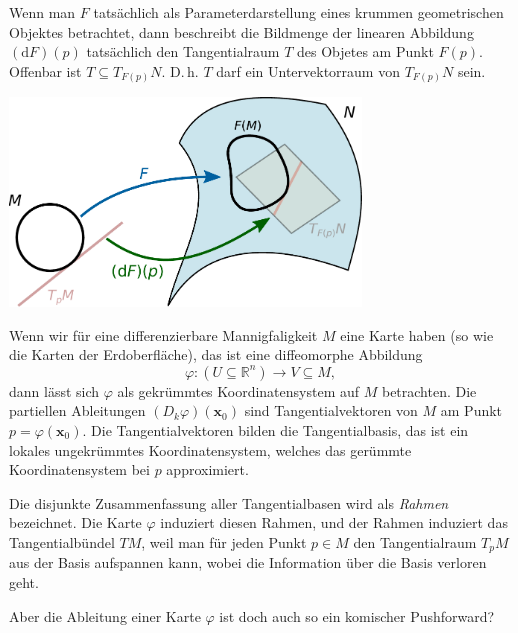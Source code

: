 \documentclass[9pt]{beamer}
\newcommand{\R}{\mathbb R}
\begin{document}
\begin{frame}
Wenn man $F$ tatsächlich als Parameterdarstellung eines krummen
geometrischen Objektes betrachtet, dann beschreibt die Bildmenge
der linearen Abbildung $(\mathrm dF)(p)$ tatsächlich den
Tangentialraum $T$ des Objetes am Punkt $F(p)$. Offenbar ist
$T\subseteq T_{F(p)}N$. D.\,h. $T$ darf ein Untervektorraum
von $T_{F(p)}N$ sein.
\end{frame}

\begin{frame}
\begin{center}
\includegraphics[width=0.7\textwidth]{img/Differential.pdf}
\end{center}
\end{frame}

\begin{frame}
Wenn wir für eine differenzierbare Mannigfaligkeit $M$ eine Karte
haben (so wie die Karten der Erdoberfläche), das ist eine diffeomorphe
Abbildung
\[\varphi\colon (U\subseteq \R^n)\to V\subseteq M,\]
dann lässt sich $\varphi$ als gekrümmtes Koordinatensystem auf $M$
betrachten. Die partiellen Ableitungen $(D_k\varphi)(\mathbf x_0)$ sind
Tangentialvektoren von $M$ am Punkt $p=\varphi(\mathbf x_0)$.
Die Tangentialvektoren bilden die Tangentialbasis, das ist ein lokales
ungekrümmtes Koordinatensystem, welches das gerümmte Koordinatensystem
bei $p$ approximiert. 
\end{frame}

\begin{frame}
Die disjunkte Zusammenfassung aller Tangentialbasen wird als
\emph{Rahmen} bezeichnet. Die Karte $\varphi$ induziert diesen
Rahmen, und der Rahmen induziert das Tangentialbündel $TM$, weil
man für jeden Punkt $p\in M$ den Tangentialraum $T_pM$ aus der Basis
aufspannen kann, wobei die Information über die Basis verloren geht.
\end{frame}

\begin{frame}
Aber die Ableitung einer Karte $\varphi$ ist doch auch so ein
komischer Pushforward?
\end{frame}
\end{document}
